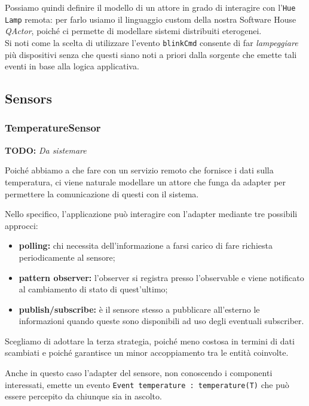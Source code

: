 \documentclass{../llncs}
\newcommand{\codescript}[1]{{\mbox{\small{\texttt{#1}}}}\xspace}
\newcommand{\qa}{\textsf{\textit{QActor}}}
\newcommand{\todo}[1]{\textbf{TODO:} \emph{#1}}
\begin{document}
Possiamo quindi definire il modello di un attore in grado di interagire con l'\texttt{Hue Lamp} remota: per farlo usiamo il linguaggio custom della nostra Software House \qa, poiché ci permette di modellare sistemi distribuiti eterogenei.\\



Si noti come la scelta di utilizzare l'evento \codescript{blinkCmd} consente di far \textit{lampeggiare} più dispositivi senza che questi siano noti a priori dalla sorgente che emette tali eventi in base alla logica applicativa.

\subsection{Sensors}

\subsubsection{TemperatureSensor}
\vspace{8px}
\todo{Da sistemare}

Poiché abbiamo a che fare con un servizio remoto che fornisce i dati sulla temperatura, ci viene naturale modellare un attore che funga da adapter per permettere la comunicazione di questi con il sistema.

Nello specifico, l'applicazione può interagire con l'adapter mediante tre possibili approcci:
\begin{itemize}
\item \textbf{polling:} chi necessita dell'informazione a farsi carico di fare richiesta periodicamente al sensore;
\item \textbf{pattern observer:} l'observer si registra presso l'observable e viene notificato al cambiamento di stato di quest'ultimo;
\item \textbf{publish/subscribe:} è il sensore stesso a pubblicare all'esterno le informazioni quando queste sono disponibili ad uso degli eventuali subscriber.
\end{itemize}
Scegliamo di adottare la terza strategia, poiché meno costosa in termini di dati scambiati e poiché garantisce un minor accoppiamento tra le entità coinvolte.

Anche in questo caso l'adapter del sensore, non conoscendo i componenti interessati, emette un evento \codescript{Event temperature : temperature(T)} che può essere percepito da chiunque sia in ascolto.\\
\end{document}
